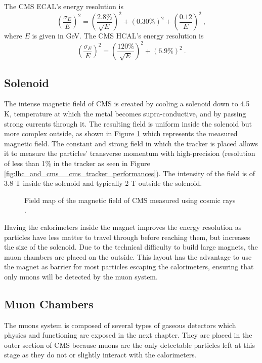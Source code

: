 				The CMS ECAL's energy resolution is \Cite{CMS_Performances}
				\begin{equation}
					\left( \frac{\sigma_E}{E} \right)^2 = \left( \frac{2.8\%}{\sqrt{E}} \right)^2 + \left( 0.30\% \right)^2 + \left( \frac{0.12}{E} \right)^2 \ ,
				\end{equation}
				where $ E $ is given in GeV. The CMS HCAL's energy resolution is
				\begin{equation}
					\left( \frac{\sigma_E}{E} \right)^2 = \left( \frac{120\%}{\sqrt{E}} \right)^2 + \left( 6.9\% \right)^2 \ .
				\end{equation}

		\subsection{Solenoid}
		\label{sec:lhc_and_cms__solenoid}

			The intense magnetic field of CMS is created by cooling a solenoid down to 4.5 K, temperature at which the metal becomes supra-conductive, and by passing strong currents through it. The resulting field is uniform inside the solenoid but more complex outside, as shown in Figure \ref{fig:lhc_and_cms__cms_magnetic_field} which represents the measured magnetic field. The constant and strong field in which the tracker is placed allows it to measure the particles' transverse momentum with high-precision (resolution of less than 1\% in the tracker as seen in Figure \ref{fig:lhc_and_cms__cms_tracker_performances}). The intensity of the field is of 3.8 T inside the solenoid and typically 2 T outside the solenoid. \\

			\begin{figure}[h!]
				\centering
				\caption{Field map of the magnetic field of CMS measured using cosmic rays \Cite{CMS_B_Field}.}
				\label{fig:lhc_and_cms__cms_magnetic_field}
			\end{figure}

			Having the calorimeters inside the magnet improves the energy resolution as particles have less matter to travel through before reaching them, but increases the size of the solenoid. Due to the technical difficulty to build large magnets, the muon chambers are placed on the outside. This layout has the advantage to use the magnet as barrier for most particles escaping the calorimeters, ensuring that only muons will be detected by the muon system.

		\subsection{Muon Chambers}
		\label{sec:lhc_and_cms__muon_chambers}

			The muons system is composed of several types of gaseous detectors which physics and functioning are exposed in the next chapter. They are placed in the outer section of CMS because muons are the only detectable particles left at this stage as they do not or slightly interact with the calorimeters.
